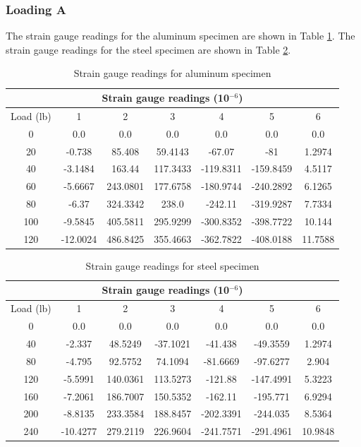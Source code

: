 \documentclass[12pt, titlepage]{article}
\begin{document}
\subsubsection{Loading A}
The strain gauge readings for the aluminum specimen are shown in Table \ref{tab:alu_A}.
The strain gauge readings for the steel specimen are shown in Table \ref{tab:steel_A}.
\begin{table}[H]
\begin{tabular}{|c|c|c|c|c|c|c|} \hline
\multicolumn{7}{|c|}{Strain gauge readings (10$^{-6}$)} \\ \hline
Load (lb) & 1 & 2 & 3 & 4 & 5 & 6 \\ \hline
0 & 0.0 & 0.0 & 0.0 & 0.0 & 0.0 & 0.0 \\ \hline
20 & -0.738 & 85.408 & 59.4143 & -67.07 & -81 & 1.2974 \\ \hline
40 & -3.1484 & 163.44 & 117.3433 & -119.8311 & -159.8459 & 4.5117 \\ \hline
60 & -5.6667 & 243.0801 & 177.6758 & -180.9744 & -240.2892 & 6.1265 \\ \hline
80 & -6.37 & 324.3342 & 238.0 & -242.11 & -319.9287 & 7.7334 \\ \hline
100 & -9.5845 & 405.5811 & 295.9299 & -300.8352 & -398.7722 & 10.144 \\ \hline
120 & -12.0024 & 486.8425 & 355.4663 & -362.7822 & -408.0188 & 11.7588 \\ \hline
\end{tabular}
\captionsetup{justification=raggedright,singlelinecheck=false}
\caption{Strain gauge readings for aluminum specimen}
\label{tab:alu_A}
\end{table}

\begin{table}[H]
\begin{tabular}{|c|c|c|c|c|c|c|} \hline
\multicolumn{7}{|c|}{Strain gauge readings (10$^{-6}$)} \\ \hline
Load (lb) & 1 & 2 & 3 & 4 & 5 & 6 \\ \hline
0 & 0.0 & 0.0 & 0.0 & 0.0 & 0.0 & 0.0 \\ \hline
40 & -2.337 & 48.5249 & -37.1021 & -41.438 & -49.3559 & 1.2974 \\ \hline
80 & -4.795 & 92.5752 & 74.1094 & -81.6669 & -97.6277 & 2.904 \\ \hline
120 & -5.5991 & 140.0361 & 113.5273 & -121.88 & -147.4991 & 5.3223 \\ \hline
160 & -7.2061 & 186.7007 & 150.5352 & -162.11 & -195.771 & 6.9294 \\ \hline
200 & -8.8135 & 233.3584 & 188.8457 & -202.3391 & -244.035 & 8.5364 \\ \hline
240 & -10.4277 & 279.2119 & 226.9604 & -241.7571 & -291.4961 & 10.9848 \\ \hline
\end{tabular}
\captionsetup{justification=raggedright,singlelinecheck=false}
\caption{Strain gauge readings for steel specimen}
\label{tab:steel_A}
\end{table}
\end{document}
